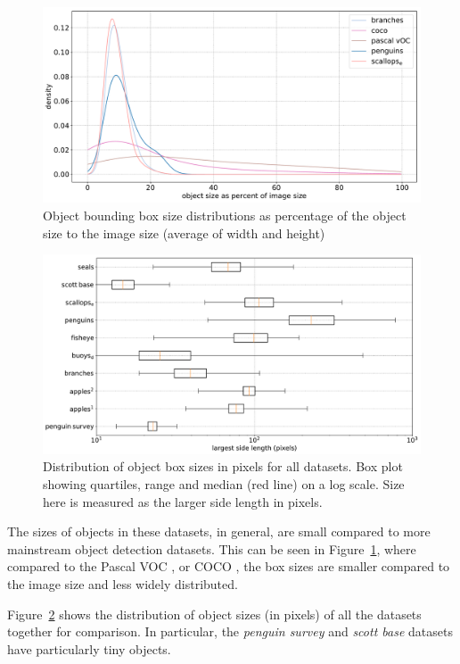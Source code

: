 \begin{figure}[ht]
\centering
\includegraphics[width=1.0\linewidth]{charts/summaries/sizes_density.pdf}
\caption{Object bounding box size distributions as percentage of the object size to the image size (average of width and height) }
\label{fig:box_sizes}
\end{figure}
 

\begin{figure}[ht]
\centering
\includegraphics[width=1.0\linewidth]{charts/summaries/sizes_boxplot.pdf}
\caption{ Distribution of object box sizes in pixels for all datasets. Box plot showing quartiles, range and median (red line) on a log scale. Size here is measured as the larger side length in pixels. }
\label{fig:box_sizes_plot}
\end{figure}

The sizes of objects in these datasets, in general, are small compared to more mainstream object detection datasets. This can be seen in Figure~\ref{fig:box_sizes}, where compared to the Pascal VOC \cite{Everingham2008}, or COCO \cite{Lin2014}, the box sizes are smaller compared to the image size and less widely distributed. 

Figure~\ref{fig:box_sizes_plot}  shows the distribution of object sizes (in pixels) of all the datasets together for comparison. In particular, the \emph{penguin survey} and \emph{scott base} datasets have particularly tiny objects.

